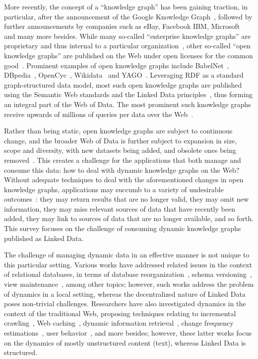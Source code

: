 \documentclass[sw]{iosart2x}
\begin{document}
More recently, the concept of a ``knowledge graph'' has been gaining traction, in particular, after the announcement of the Google Knowledge Graph~\cite{GoogleKG}, followed by further announcements by companies such as eBay, Facebook IBM, Microsoft~\cite{NoyGJNPT19} and many more besides. While many so-called ``enterprise knowledge graphs'' are proprietary and thus internal to a particular organization~\cite{NoyGJNPT19}, other so-called ``open knowledge graphs'' are published on the Web under open licenses for the common good~\cite{FarberBMR18}. Prominent examples of open knowledge graphs include BabelNet~\cite{NavigliP12}, DBpedia~\cite{dbpedia}, OpenCyc~\cite{FarberBMR18}, Wikidata~\cite{VrandecicK14} and YAGO~\cite{HoffartSBW13}. Leveraging RDF as a standard graph-structured data model, most such open knowledge graphs are published using the Semantic Web standards and the Linked Data principles~\cite{FarberBMR18,MalyshevKGGB18}, thus forming an integral part of the Web of Data. The most prominent such knowledge graphs receive upwards of millions of queries per data over the Web~\cite{SaleemAHMN15,MalyshevKGGB18}.
\medskip

Rather than being static, open knowledge graphs are subject to continuous change, and the broader Web of Data is further subject to expansion in size, scope and diversity, with new datasets being added, and obsolete ones being removed~\cite{UmbrichHHPD10, AuerDML12, KaferAUOH13, DividinoSGG13, SchmachtenbergBP14}. This creates a challenge for the applications that both manage and consume this data: how to deal with dynamic knowledge graphs on the Web? Without adequate techniques to deal with the aforementioned changes in open knowledge graphs, applications may succumb to a variety of undesirable outcomes~\cite{MeimarisPPGS14}: they may return results that are no longer valid, they may omit new information, they may miss relevant sources of data that have recently been added, they may link to sources of data that are no longer available, and so forth. This survey focuses on the challenge of consuming dynamic knowledge graphs published as Linked Data.
\medskip


The challenge of managing dynamic data in an effective manner is not unique to this particular setting. Various works have addressed related issues in the context of relational databases, in terms of database reorganization~\cite{LernerH90}, schema versioning~\cite{Roddick95}, view maintenance~\cite{GuptaM95}, among other topics; however, such works address the problem of dynamics in a local setting, whereas the decentralized nature of Linked Data poses non-trivial challenges. Researchers have also investigated dynamics in the context of the traditional Web, proposing techniques relating to incremental crawling~\cite{ChoG00}, Web caching~\cite{GaddeCR01}, dynamic information retrieval~\cite{RisvikM02}, change frequency estimations~\cite{ChoG03}, user behavior~\cite{AlmeidaMC07}, and more besides; however, these latter works focus on the dynamics of mostly unstructured content (text), whereas Linked Data is structured.
\end{document}
